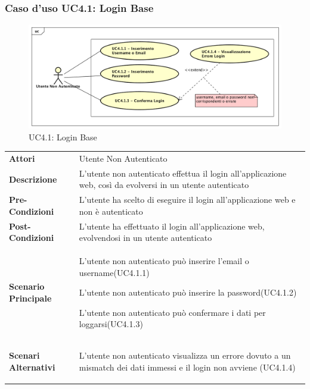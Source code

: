 \subsubsection{Caso d'uso UC4.1:  Login Base}
\label{UC4_1}
\begin{figure}[ht]
	\centering
	\includegraphics[scale=0.45]{UML/UC4_1.png}
	\caption{UC4.1: Login Base}
\end{figure}

\begin{tabular}{ l | p{11cm}}
	\hline
	\rowcolor{Gray}
	 \multicolumn{2}{c}{UC4.1 - Login Base} \\
	 \hline
	\textbf{Attori} & Utente Non Autenticato \\
	\textbf{Descrizione} & L'utente non autenticato effettua il login all'applicazione web, così da evolversi in un utente autenticato\\
	\textbf{Pre-Condizioni} & L'utente ha scelto di eseguire il login all'applicazione web e non è autenticato \\
	\textbf{Post-Condizioni} & L'utente ha effettuato il login all'applicazione web, evolvendosi in un utente autenticato \\
	\textbf{Scenario Principale} & 
	\begin{enumerate*}[label=(\arabic*.),itemjoin={\newline}]
		\item L'utente non autenticato può inserire l'email o username(UC4.1.1)
		\item L'utente non autenticato può inserire la password(UC4.1.2)
		\item L'utente non autenticato può confermare i dati per loggarsi(UC4.1.3)
	\end{enumerate*}\\
		\textbf{Scenari Alternativi} & 
	\begin{enumerate*}[label=(\arabic*.),itemjoin={\newline}]
		\item L'utente non autenticato visualizza un errore dovuto a un mismatch dei dati immessi e il login non avviene (UC4.1.4)
	\end{enumerate*}\\
\end{tabular}